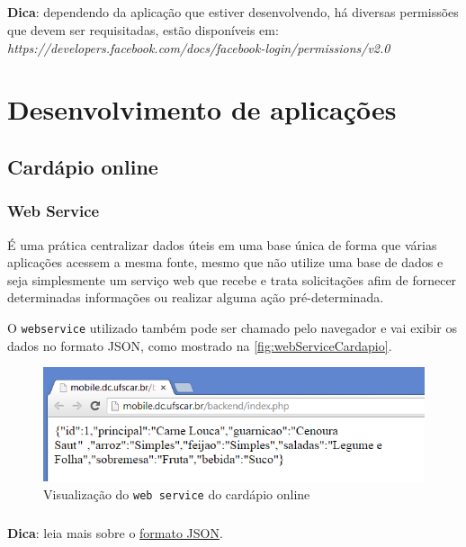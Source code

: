 \documentclass[a4paper,12pt,brazil,oneside]{book}
\begin{document}
\begin{framed}
	\paragraph{}\textbf{Dica}: dependendo da aplicação que estiver desenvolvendo, há diversas permissões que devem ser requisitadas, estão disponíveis em: 
	\textit{https://developers.facebook.com/docs/facebook-login/permissions/v2.0}
	\end{framed}
	
	
\chapter{Desenvolvimento de aplicações}


\section{Cardápio online}

\subsection{Web Service}

É uma prática centralizar dados úteis em uma base única de forma que várias aplicações acessem a mesma fonte, mesmo que não utilize uma base de dados e seja simplesmente um serviço web que recebe e trata solicitações afim de fornecer determinadas informações ou realizar alguma ação pré-determinada.

O \texttt{webservice} utilizado também pode ser chamado pelo navegador e vai exibir os dados no formato JSON, como mostrado na \autoref{fig:webServiceCardapio}.

\begin{figure}[H]
  \centering
  \includegraphics[width=.75\textwidth]{figuras/devapp/cardapio/APP_Cardapio3.png}
  \caption{Visualização do \texttt{web service} do cardápio online}
  \label{fig:webServiceCardapio}
\end{figure}

\begin{framed}
\paragraph{}\textbf{Dica}: leia mais sobre o \href{http://alexandregama.org/2011/12/19/json-simples-e-pratico-parte-i/}{formato JSON}.
\end{framed}
\end{document}
